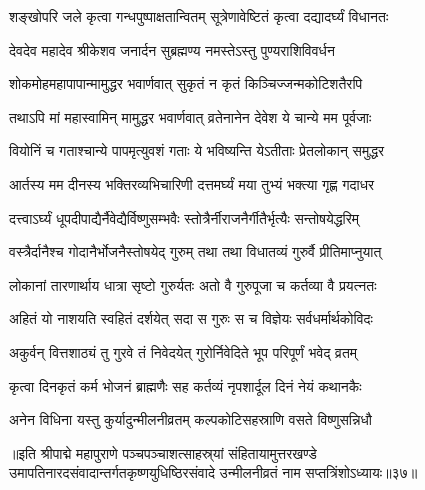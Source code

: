 \twolineshloka
{शङ्खोपरि जले कृत्वा गन्धपुष्पाक्षतान्वितम्}
{सूत्रेणावेष्टितं कृत्वा दद्यादर्घ्यं विधानतः}%

\twolineshloka
{देवदेव महादेव श्रीकेशव जनार्दन}
{सुब्रह्मण्य नमस्तेऽस्तु पुण्यराशिविवर्धन}%

\twolineshloka
{शोकमोहमहापापान्मामुद्धर भवार्णवात्}
{सुकृतं न कृतं किञ्चिज्जन्मकोटिशतैरपि}%

\twolineshloka
{तथाऽपि मां महास्वामिन् मामुद्धर भवार्णवात्}
{व्रतेनानेन देवेश ये चान्ये मम पूर्वजाः}%

\twolineshloka
{वियोनिं च गताश्चान्ये पापमृत्युवशं गताः}
{ये भविष्यन्ति येऽतीताः प्रेतलोकान् समुद्धर}%

\twolineshloka
{आर्तस्य मम दीनस्य भक्तिरव्यभिचारिणी}
{दत्तमर्घ्यं मया तुभ्यं भक्त्या गृह्ण गदाधर}%

\twolineshloka
{दत्त्वाऽर्घ्यं धूपदीपाद्यैर्नैवेद्यैर्विष्णुसम्भवैः}
{स्तोत्रैर्नीराजनैर्गीतैर्भृत्यैः सन्तोषयेद्धरिम्}%

\twolineshloka
{वस्त्रैर्दानैश्च गोदानैर्भोजनैस्तोषयेद् गुरुम्}
{तथा तथा विधातव्यं गुरुर्वै प्रीतिमाप्नुयात्}%

\twolineshloka
{लोकानां तारणार्थाय धात्रा सृष्टो गुरुर्यतः}
{अतो वै गुरुपूजा च कर्तव्या वै प्रयत्नतः}%

\twolineshloka
{अहितं यो नाशयति स्वहितं दर्शयेत् सदा}
{स गुरुः स च विज्ञेयः सर्वधर्मार्थकोविदः}%

\twolineshloka
{अकुर्वन् वित्तशाठ्यं तु गुरवे तं निवेदयेत्}
{गुरोर्निवेदिते भूप परिपूर्णं भवेद् व्रतम्}%

\twolineshloka
{कृत्वा दिनकृतं कर्म भोजनं ब्राह्मणैः सह}
{कर्तव्यं नृपशार्दूल दिनं नेयं कथानकैः}%

\twolineshloka
{अनेन विधिना यस्तु कुर्यादुन्मीलनीव्रतम्}
{कल्पकोटिसहस्राणि वसते विष्णुसन्निधौ}%

॥इति श्रीपाद्मे महापुराणे पञ्चपञ्चाशत्साहस्र्यां संहितायामुत्तरखण्डे उमापतिनारदसंवादान्तर्गतकृष्णयुधिष्ठिरसंवादे उन्मीलनीव्रतं नाम सप्तत्रिंशोऽध्यायः॥३७॥

\genMangalaShloka

\hyperref[sec:ekadashi_mahatmyam_padma_puranam]{\closesub}
\clearpage

\label{sec:padma-pakshavardhini}

\ganapatyadiDhyanam
\padmaPuranam



